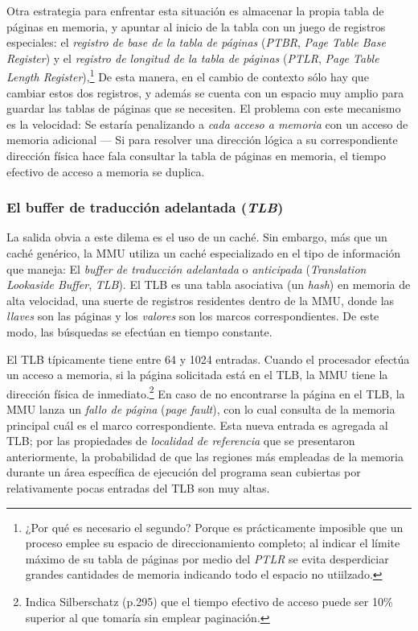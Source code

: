 \documentclass[11pt,fleqn]{book} %
\begin{document}
Otra estrategia para enfrentar esta situación es almacenar la propia
tabla de páginas en memoria, y apuntar al inicio de la tabla con un
juego de registros especiales: el \emph{registro de base de la tabla de páginas} (\emph{PTBR}, \emph{Page Table Base Register}) y el \emph{registro de longitud de la tabla de páginas} (\emph{PTLR}, \emph{Page Table Length Register}),\footnote{¿Por qué es necesario el segundo? Porque es
prácticamente imposible que un proceso emplee su espacio de
direccionamiento completo; al indicar el límite máximo de su tabla de
páginas por medio del \emph{PTLR} se evita desperdiciar grandes cantidades
de memoria indicando todo el espacio no utiilzado. } De esta manera, en
el cambio de contexto sólo hay que cambiar estos dos registros, y además
se cuenta con un espacio muy amplio para guardar las tablas de páginas
que se necesiten. El problema con este mecanismo es la velocidad:
Se estaría penalizando a \emph{cada acceso a memoria} con un acceso de
memoria adicional — Si para resolver una dirección lógica a su
correspondiente dirección física hace fala consultar la tabla de
páginas en memoria, el tiempo efectivo de acceso a memoria se duplica.
\subsubsection{El buffer de traducción adelantada (\emph{TLB})}
\label{sec-5-4-2-1}
\label{MEM_tlb}


La salida obvia a este dilema es el uso de un caché. Sin embargo, más
que un caché genérico, la MMU utiliza un caché especializado en el
tipo de información que maneja: El \emph{buffer de traducción adelantada} o
\emph{anticipada} (\emph{Translation Lookaside Buffer}, \emph{TLB}). El TLB es una
tabla asociativa (un \emph{hash}) en memoria de alta velocidad, una suerte
de registros residentes dentro de la MMU, donde las \emph{llaves} son las
páginas y los \emph{valores} son los marcos correspondientes. De este modo,
las búsquedas se efectúan en tiempo constante.

El TLB típicamente tiene entre 64 y 1024 entradas. Cuando el
procesador efectúa un acceso a memoria, si la página solicitada está
en el TLB, la MMU tiene la dirección física de inmediato.\footnote{Indica
Silberschatz (p.295) que el tiempo efectivo de acceso puede ser 10\%
superior al que tomaría sin emplear paginación. } En caso de no
encontrarse la página en el TLB, la MMU lanza un \emph{fallo de página}
(\emph{page fault}), con lo cual consulta de la memoria principal cuál es
el marco correspondiente. Esta nueva entrada es agregada al TLB; por
las propiedades de \emph{localidad de referencia} que se presentaron anteriormente,
la probabilidad de que las regiones más empleadas de la memoria
durante un área específica de ejecución del programa sean cubiertas
por relativamente pocas entradas del TLB son muy altas.
\end{document}
